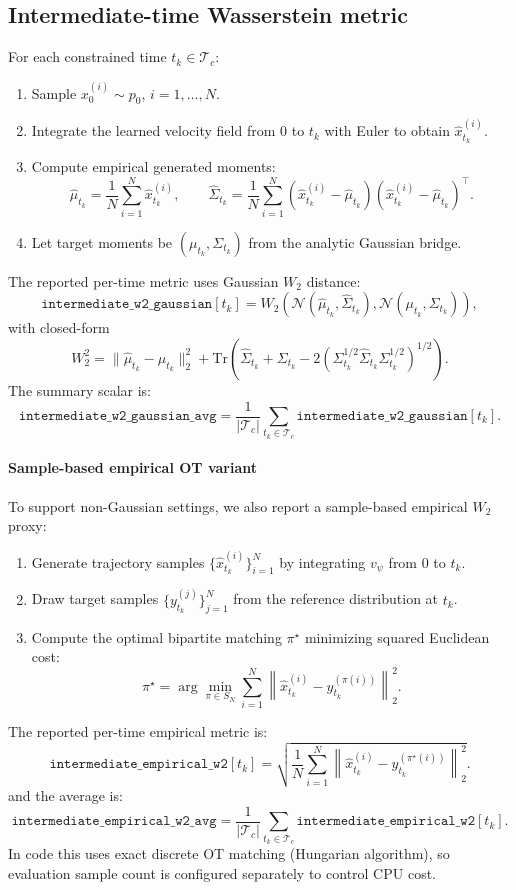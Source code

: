 \documentclass[11pt]{article}
\begin{document}
\subsection*{Intermediate-time Wasserstein metric}
For each constrained time $t_k \in \mathcal{T}_c$:
\begin{enumerate}
    \item Sample $x_0^{(i)} \sim p_0$, $i=1,\dots,N$.
    \item Integrate the learned velocity field from $0$ to $t_k$ with Euler to obtain $\hat{x}_{t_k}^{(i)}$.
    \item Compute empirical generated moments:
    \[
    \hat{\mu}_{t_k} = \frac{1}{N}\sum_{i=1}^N \hat{x}_{t_k}^{(i)},
    \qquad
    \hat{\Sigma}_{t_k} = \frac{1}{N}\sum_{i=1}^N
    (\hat{x}_{t_k}^{(i)}-\hat{\mu}_{t_k})(\hat{x}_{t_k}^{(i)}-\hat{\mu}_{t_k})^\top.
    \]
    \item Let target moments be $(\mu_{t_k},\Sigma_{t_k})$ from the analytic Gaussian bridge.
\end{enumerate}
The reported per-time metric uses Gaussian $W_2$ distance:
\[
\texttt{intermediate\_w2\_gaussian}[t_k]
=
W_2\!\left(
\mathcal{N}(\hat{\mu}_{t_k},\hat{\Sigma}_{t_k}),
\mathcal{N}(\mu_{t_k},\Sigma_{t_k})
\right),
\]
with closed-form
\[
W_2^2
=
\|\hat{\mu}_{t_k}-\mu_{t_k}\|_2^2
+
\mathrm{Tr}\!\left(
\hat{\Sigma}_{t_k}
+
\Sigma_{t_k}
-
2\left(\Sigma_{t_k}^{1/2}\hat{\Sigma}_{t_k}\Sigma_{t_k}^{1/2}\right)^{1/2}
\right).
\]
The summary scalar is:
\[
\texttt{intermediate\_w2\_gaussian\_avg}
=
\frac{1}{|\mathcal{T}_c|}\sum_{t_k\in\mathcal{T}_c}
\texttt{intermediate\_w2\_gaussian}[t_k].
\]

\paragraph{Sample-based empirical OT variant}
To support non-Gaussian settings, we also report a sample-based empirical $W_2$ proxy:
\begin{enumerate}
    \item Generate trajectory samples $\{\hat{x}_{t_k}^{(i)}\}_{i=1}^N$ by integrating $v_\psi$ from $0$ to $t_k$.
    \item Draw target samples $\{y_{t_k}^{(j)}\}_{j=1}^N$ from the reference distribution at $t_k$.
    \item Compute the optimal bipartite matching $\pi^\star$ minimizing squared Euclidean cost:
    \[
    \pi^\star = \arg\min_{\pi \in S_N}\sum_{i=1}^N
    \left\|\hat{x}_{t_k}^{(i)}-y_{t_k}^{(\pi(i))}\right\|_2^2.
    \]
\end{enumerate}
The reported per-time empirical metric is:
\[
\texttt{intermediate\_empirical\_w2}[t_k]
=
\sqrt{
\frac{1}{N}
\sum_{i=1}^N
\left\|\hat{x}_{t_k}^{(i)}-y_{t_k}^{(\pi^\star(i))}\right\|_2^2
}.
\]
and the average is:
\[
\texttt{intermediate\_empirical\_w2\_avg}
=
\frac{1}{|\mathcal{T}_c|}\sum_{t_k\in\mathcal{T}_c}
\texttt{intermediate\_empirical\_w2}[t_k].
\]
In code this uses exact discrete OT matching (Hungarian algorithm), so evaluation sample count is configured separately to control CPU cost.
\end{document}
